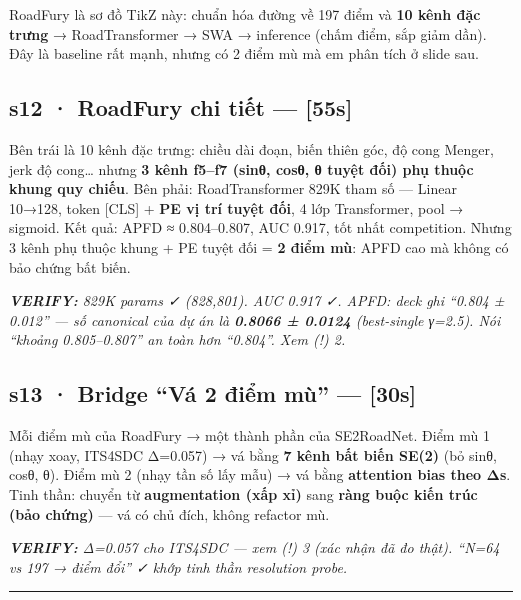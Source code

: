 \documentclass[
  11pt,
]{article}
\renewenvironment{quote}
  {\par\smallskip\noindent
   \def\FrameCommand{{\color{deckorange}\vrule width 2.5pt}\hspace{10pt}}%
   \MakeFramed{\advance\hsize-\width\FrameRestore}%
   \footnotesize\itshape\color{deckslate}}
  {\par\endMakeFramed\smallskip}
\begin{document}
RoadFury là sơ đồ TikZ này: chuẩn hóa đường về 197 điểm và \textbf{10
kênh đặc trưng} → RoadTransformer → SWA → inference (chấm điểm, sắp giảm
dần). Đây là baseline rất mạnh, nhưng có 2 điểm mù mà em phân tích ở
slide sau.

\subsection{s12 · RoadFury chi tiết ---
{[}55s{]}}\label{s12-roadfury-chi-tiux1ebft-55s}

Bên trái là 10 kênh đặc trưng: chiều dài đoạn, biến thiên góc, độ cong
Menger, jerk độ cong\ldots{} nhưng \textbf{3 kênh f5--f7 (sinθ, cosθ, θ
tuyệt đối) phụ thuộc khung quy chiếu}. Bên phải: RoadTransformer 829K
tham số --- Linear 10→128, token {[}CLS{]} + \textbf{PE vị trí tuyệt
đối}, 4 lớp Transformer, pool → sigmoid. Kết quả: APFD ≈ 0.804--0.807,
AUC 0.917, tốt nhất competition. Nhưng 3 kênh phụ thuộc khung + PE tuyệt
đối = \textbf{2 điểm mù}: APFD cao mà không có bảo chứng bất biến.

\begin{quote}
\textbf{VERIFY:} 829K params ✓ (828,801). AUC 0.917 ✓. APFD: deck ghi
``0.804 ± 0.012'' --- số canonical của dự án là \textbf{0.8066 ± 0.0124}
(best-single γ=2.5). Nói ``khoảng 0.805--0.807'' an toàn hơn ``0.804''.
Xem (!) 2.
\end{quote}

\subsection{s13 · Bridge ``Vá 2 điểm mù'' ---
{[}30s{]}}\label{s13-bridge-vuxe1-2-ux111iux1ec3m-muxf9-30s}

Mỗi điểm mù của RoadFury → một thành phần của SE2RoadNet. Điểm mù 1
(nhạy xoay, ITS4SDC Δ=0.057) → vá bằng \textbf{7 kênh bất biến SE(2)}
(bỏ sinθ, cosθ, θ). Điểm mù 2 (nhạy tần số lấy mẫu) → vá bằng
\textbf{attention bias theo Δs}. Tinh thần: chuyển từ
\textbf{augmentation (xấp xỉ)} sang \textbf{ràng buộc kiến trúc (bảo
chứng)} --- vá có chủ đích, không refactor mù.

\begin{quote}
\textbf{VERIFY:} Δ=0.057 cho ITS4SDC --- xem (!) 3 (xác nhận đã đo
thật). ``N=64 vs 197 → điểm đổi'' ✓ khớp tinh thần resolution probe.
\end{quote}

\begin{center}\rule{0.5\linewidth}{0.5pt}\end{center}
\end{document}
